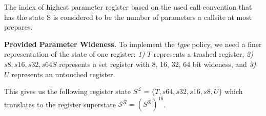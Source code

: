 %
%
%

The index of highest parameter register based on the used call convention that has the state S is considered to be the number of parameters a callsite at most prepares.

\textbf{Provided Parameter Wideness.}
\label{subsection:providedparamwideness}
To implement the \emph{type} policy, we need a finer representation of the state of one register:
\textit{1)} $T$ represents a trashed register,
\textit{2)} $s8, s16, s32, s64 S$ represents a set register with  8, 16, 32, 64 bit  wideness, and
\textit{3)} $U$ represents an untouched register.

This gives us the following register state $S^\mathcal{L} = \{ T, s64, s32, s16, s8, U \}$ which translates to the register 
superstate $\mathcal{S}^\mathcal{R} = (S^\mathcal{R})^{16}$.

